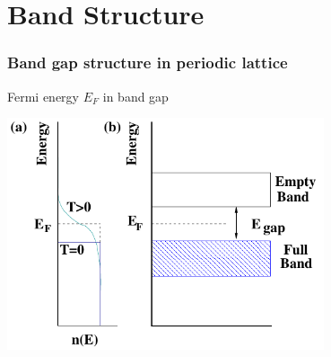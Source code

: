 \documentclass[beamer]{standalone}
\begin{document}
\section{Band Structure}
\begin{frame}[t]
 \frametitle{Band gap structure in periodic lattice}
 \begin{block}{Fermi energy $E_F$ in band gap}
  \begin{center}
   \includegraphics[width=0.7\textwidth]{pics/bandgap}
  \end{center}
 \end{block}
\end{frame}
\end{document}
